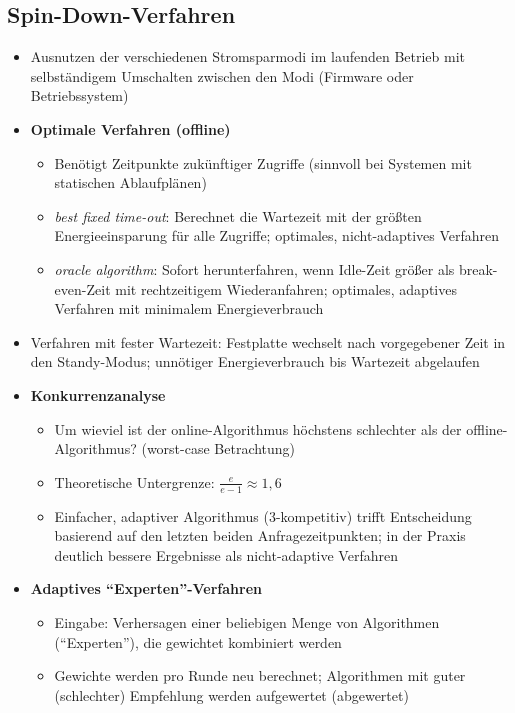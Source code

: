 \subsection{Spin-Down-Verfahren}
\begin{itemize}
	\item Ausnutzen der verschiedenen Stromsparmodi im laufenden Betrieb mit selbständigem Umschalten zwischen den Modi (Firmware oder Betriebssystem)
	\item \textbf{Optimale Verfahren (offline)}
	\begin{itemize}
		\item Benötigt Zeitpunkte zukünftiger Zugriffe (sinnvoll bei Systemen mit statischen Ablaufplänen)
		\item \textit{best fixed time-out}: Berechnet die Wartezeit mit der größten Energieeinsparung für alle Zugriffe; optimales, nicht-adaptives Verfahren
		\item \textit{oracle algorithm}: Sofort herunterfahren, wenn Idle-Zeit größer als break-even-Zeit mit rechtzeitigem Wiederanfahren; optimales, adaptives Verfahren mit minimalem Energieverbrauch
	\end{itemize}
	\item Verfahren mit fester Wartezeit: Festplatte wechselt nach vorgegebener Zeit in den Standy-Modus; unnötiger Energieverbrauch bis Wartezeit abgelaufen
	\item \textbf{Konkurrenzanalyse}
	\begin{itemize}
		\item Um wieviel ist der online-Algorithmus höchstens schlechter als der offline-Algorithmus? (worst-case Betrachtung)
		\item Theoretische Untergrenze: \(\frac{e}{e-1} \approx 1,6\)
		\item Einfacher, adaptiver Algorithmus (3-kompetitiv) trifft Entscheidung basierend auf den letzten beiden Anfragezeitpunkten; in der Praxis deutlich bessere Ergebnisse als nicht-adaptive Verfahren
	\end{itemize}
	\item \textbf{Adaptives "`Experten"'-Verfahren}
	\begin{itemize}
		\item Eingabe: Verhersagen einer beliebigen Menge von Algorithmen ("`Experten"'), die gewichtet kombiniert werden
		\item Gewichte werden pro Runde neu berechnet; Algorithmen mit guter (schlechter) Empfehlung werden aufgewertet (abgewertet)
	\end{itemize}

\end{itemize}
